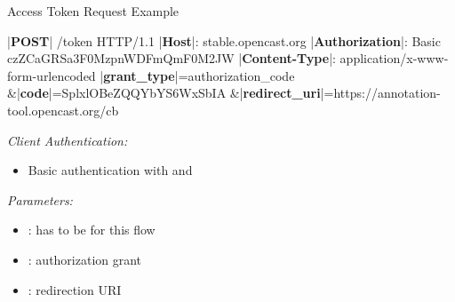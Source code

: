 \documentclass[aspectratio=169]{beamer}
\begin{document}
\begin{frame}[fragile]{Access Token Request Example}
\begin{textcode}
|\textbf{POST}| /token HTTP/1.1
|\textbf{Host}|: stable.opencast.org
|\textbf{Authorization}|: Basic czZCaGRSa3F0MzpnWDFmQmF0M2JW
|\textbf{Content-Type}|: application/x-www-form-urlencoded
  |\textbf{grant\_type}|=authorization_code
  &|\textbf{code}|=SplxlOBeZQQYbYS6WxSbIA
  &|\textbf{redirect\_uri}|=https://annotation-tool.opencast.org/cb
\end{textcode}

\hfill {}
	
	\vspace*{-2mm}
	\emph{Client Authentication:}
	\begin{itemize}
		\item Basic authentication with  and 
	\end{itemize}
	\emph{Parameters:}
	\begin{itemize}
		\item {}: has to be  for this flow
		\item {}: authorization grant \hfill {}
		\item {}: redirection URI \hfill {}
	\end{itemize}
	\vspace{-1mm}
\end{frame}
\end{document}
